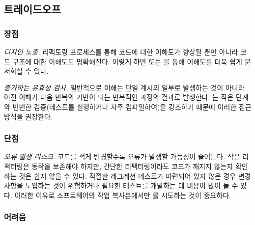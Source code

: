 \documentclass[a4paper,10pt,twoside]{book}
\begin{document}
\subsection*{트레이드오프}

\subsubsection*{장점}

\begin{bulletlist}
\item \emph{디자인 노출.}
리팩토링 프로세스를 통해 코드에 대한 이해도가 향상될 뿐만 아니라 코드 구조에 대한 이해도도 명확해진다. 이렇게 하면  또는 를 통해 이해도를 더욱 쉽게 문서화할 수 있다.

\item \emph{증가하는 유효성 검사.}
일반적으로 이해는 단일 계시의 일부로 발생하는 것이 아니라 이전 이해가 다음 반복의 기반이 되는 반복적인 과정의 결과로 발생한다. 는 작은 단계와 빈번한 검증(테스트를 실행하거나 자주 컴파일하여)을 강조하기 때문에 이러한 접근 방식을 권장한다.
\end{bulletlist}

\subsubsection*{단점}

\begin{bulletlist}
\item \emph{오류 발생 리스크.}
코드를 적게 변경할수록 오류가 발생할 가능성이 줄어든다. 작은 리팩터링은 동작을 보존해야 하지만, 간단한 리팩터링이라도 코드가 깨지지 않는지 확인하는 것은 쉽지 않을 수 있다. 적절한 레그레션 테스트가 마련되어 있지 않은 경우 변경 사항을 도입하는 것이 위험하거나 필요한 테스트를 개발하는 데 비용이 많이 들 수 있다. 이러한 이유로 소프트웨어의 작업 복사본에서만 를 시도하는 것이 중요하다.
\end{bulletlist}

\subsubsection*{어려움}
\end{document}
